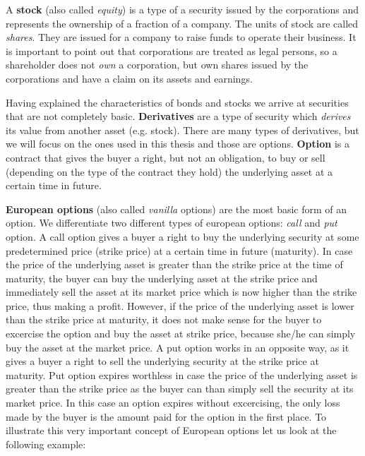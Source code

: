 \documentclass[times, utf8, diplomski]{fer}
\begin{document}
\hfill \break
A \textbf{stock} (also called \textit{equity}) is a type of a security issued by the corporations and represents the ownership of a fraction of a company. The units of stock are called \textit{shares}. They are issued for a company to raise funds to operate their business. It is important to point out that corporations are treated as legal persons, so a shareholder does not \textit{own} a corporation, but own shares issued by the corporations and have a claim on its assets and earnings.

\hfill \break
Having explained the characteristics of bonds and stocks we arrive at securities that are not completely basic. \textbf{Derivatives} are a type of security which \textit{derives} its value from another asset (e.g. stock). There are many types of derivatives, but we will focus on the ones used in this thesis and those are options. \textbf{Option} is a contract that gives the buyer a right, but not an obligation, to buy or sell (depending on the type of the contract they hold) the underlying asset at a certain time in future. 

\hfill \break
\textbf{European options} (also called \textit{vanilla} options) are the most basic form of an option. We differentiate two different types of european options: \textit{call} and \textit{put} option. A call option gives a buyer a right to buy the underlying security at some predetermined price (strike price) at a certain time in future (maturity). In case the price of the underlying asset is greater than the strike price at the time of maturity, the buyer can buy the underlying asset at the strike price and immediately sell the asset at its market price which is now higher than the strike price, thus making a profit. However, if the price of the underlying asset is lower than the strike price at maturity, it does not make sense for the buyer to excercise the option and buy the asset at strike price, because she/he can simply buy the asset at the market price. A put option works in an opposite way, as it gives a buyer a right to sell the underlying security at the strike price at maturity. Put option expires worthless in case the price of the underlying asset is greater than the strike price as the buyer can than simply sell the security at its market price. In this case an option expires without excercising, the only loss made by the buyer is the amount paid for the option in the first place. To illustrate this very important concept of European options let us look at the following example:
\end{document}
